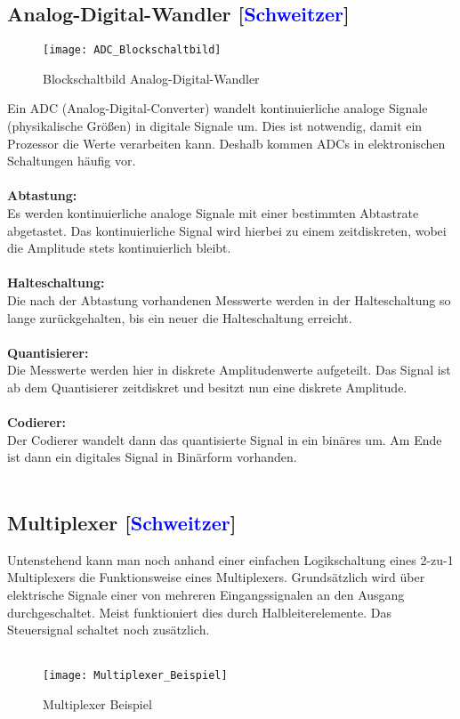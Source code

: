 \documentclass[titlepage,12pt,twoside]{article}
\begin{document}
\subsection{Analog-Digital-Wandler [\textcolor{blue}{Schweitzer}]}
\label{chap:Analog-Digital-Wandler}
\begin{figure}[H]
	\begin{center}
		\scalebox{1.2}
		{\texttt{[image: ADC\_Blockschaltbild]}}
		\caption{Blockschaltbild Analog-Digital-Wandler}
		\label{fig:ADC_Blockschaltbild}
	\end{center}
\end{figure}
\hfill \break
Ein ADC (Analog-Digital-Converter) wandelt kontinuierliche analoge Signale 
(physikalische Größen) in digitale Signale um. Dies ist notwendig, damit ein 
Prozessor die Werte verarbeiten kann. Deshalb kommen ADCs in elektronischen 
Schaltungen häufig vor. \\
\\
\textbf{Abtastung:} \\
Es werden kontinuierliche analoge Signale mit einer bestimmten 
Abtastrate abgetastet. Das kontinuierliche Signal wird hierbei zu einem 
zeitdiskreten, wobei die Amplitude stets kontinuierlich bleibt. \\
\\
\textbf{Halteschaltung:} \\
Die nach der Abtastung vorhandenen Messwerte werden in der Halteschaltung so 
lange zurückgehalten, bis ein neuer die Halteschaltung erreicht. \\
\\
\textbf{Quantisierer:} \\
Die Messwerte werden hier in diskrete Amplitudenwerte aufgeteilt. Das Signal 
ist ab dem Quantisierer zeitdiskret und besitzt nun eine diskrete Amplitude. \\
\\
\textbf{Codierer:} \\
Der Codierer wandelt dann das quantisierte Signal in ein binäres um. Am Ende ist 
dann ein digitales Signal in Binärform vorhanden. \\
\\
\subsection{Multiplexer [\textcolor{blue}{Schweitzer}]}
\label{chap:Multiplexer}
Untenstehend kann man noch anhand einer einfachen Logikschaltung eines 2-zu-1 
Multiplexers die Funktionsweise eines Multiplexers. Grundsätzlich wird über elektrische 
Signale einer von mehreren Eingangssignalen an den Ausgang durchgeschaltet. Meist 
funktioniert dies durch Halbleiterelemente. Das Steuersignal schaltet noch zusätzlich. \\
\\
\begin{figure}[H]
	\begin{center}
		\scalebox{1.0}
		{\texttt{[image: Multiplexer\_Beispiel]}}
		\caption{Multiplexer Beispiel}
		\label{fig:Multiplexer_Beispiel}
	\end{center}
\end{figure}
\hfill \break
\end{document}
